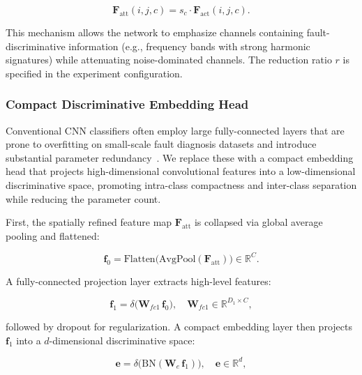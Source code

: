 \documentclass[journal]{IEEEtran}
\begin{document}
\begin{equation}
\boldsymbol{F}_{\mathrm{att}}(i, j, c) = s_c \cdot \boldsymbol{F}_{\mathrm{act}}(i, j, c).
\label{eq:attention_feature}
\end{equation}

This mechanism allows the network to emphasize channels containing fault-discriminative information (e.g., frequency bands with strong harmonic signatures) while attenuating noise-dominated channels. The reduction ratio $r$ is specified in the experiment configuration.

\subsubsection{Compact Discriminative Embedding Head}

Conventional CNN classifiers often employ large fully-connected layers that are prone to overfitting on small-scale fault diagnosis datasets and introduce substantial parameter redundancy~\cite{9770845}. We replace these with a compact embedding head that projects high-dimensional convolutional features into a low-dimensional discriminative space, promoting intra-class compactness and inter-class separation while reducing the parameter count.

First, the spatially refined feature map $\boldsymbol{F}_{\mathrm{att}}$ is collapsed via global average pooling and flattened:

\begin{equation}
\boldsymbol{f}_0 = \mathrm{Flatten}\big(\mathrm{AvgPool}(\boldsymbol{F}_{\mathrm{att}})\big) \in \mathbb{R}^{C}.
\label{eq:flatten_feature}
\end{equation}

A fully-connected projection layer extracts high-level features:

\begin{equation}
\boldsymbol{f}_1 = \delta\big(\boldsymbol{W}_{\!fc1}\, \boldsymbol{f}_0\big), \quad \boldsymbol{W}_{\!fc1} \in \mathbb{R}^{D_1 \times C},
\label{eq:fc1_feature}
\end{equation}

followed by dropout for regularization. A compact embedding layer then projects $\boldsymbol{f}_1$ into a $d$-dimensional discriminative space:

\begin{equation}
\boldsymbol{e} = \delta\big(\mathrm{BN}(\boldsymbol{W}_{\!e}\, \boldsymbol{f}_1)\big), \quad \boldsymbol{e} \in \mathbb{R}^{d},
\label{eq:embedding}
\end{equation}
\end{document}
